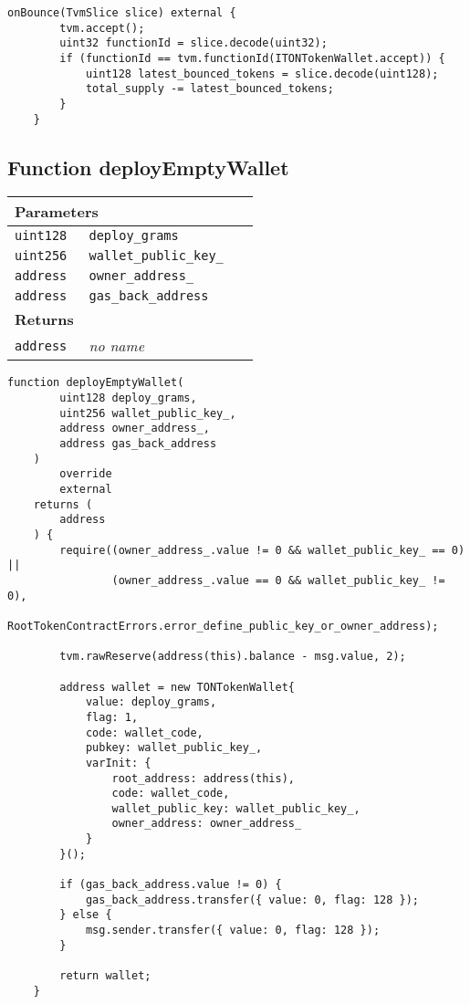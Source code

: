 \vspace{2cm}

\begin{lstlisting}[firstnumber=514]
    onBounce(TvmSlice slice) external {
        tvm.accept();
        uint32 functionId = slice.decode(uint32);
        if (functionId == tvm.functionId(ITONTokenWallet.accept)) {
            uint128 latest_bounced_tokens = slice.decode(uint128);
            total_supply -= latest_bounced_tokens;
        }
    }
\end{lstlisting}

\subsection{Function deployEmptyWallet}


\ifsoltables
\noindent\begin{tabular}{|l|l|p{5cm}|}\hline
\multicolumn{3}{|l|}{\bf Parameters}\\\hline
\tt uint128 & \tt deploy\_{}grams &\\\hline
\tt uint256 & \tt wallet\_{}public\_{}key\_{} &\\\hline
\tt address & \tt owner\_{}address\_{} &\\\hline
\tt address & \tt gas\_{}back\_{}address &\\\hline
\multicolumn{3}{|l|}{\bf Returns}\\\hline
\tt address & {\em no name} &\\\hline
\end{tabular}
\fi

\vspace{2cm}

\begin{lstlisting}[firstnumber=237]
    function deployEmptyWallet(
        uint128 deploy_grams,
        uint256 wallet_public_key_,
        address owner_address_,
        address gas_back_address
    )
        override
        external
    returns (
        address
    ) {
        require((owner_address_.value != 0 && wallet_public_key_ == 0) ||
                (owner_address_.value == 0 && wallet_public_key_ != 0),
                RootTokenContractErrors.error_define_public_key_or_owner_address);

        tvm.rawReserve(address(this).balance - msg.value, 2);

        address wallet = new TONTokenWallet{
            value: deploy_grams,
            flag: 1,
            code: wallet_code,
            pubkey: wallet_public_key_,
            varInit: {
                root_address: address(this),
                code: wallet_code,
                wallet_public_key: wallet_public_key_,
                owner_address: owner_address_
            }
        }();

        if (gas_back_address.value != 0) {
            gas_back_address.transfer({ value: 0, flag: 128 });
        } else {
            msg.sender.transfer({ value: 0, flag: 128 });
        }

        return wallet;
    }
\end{lstlisting}

